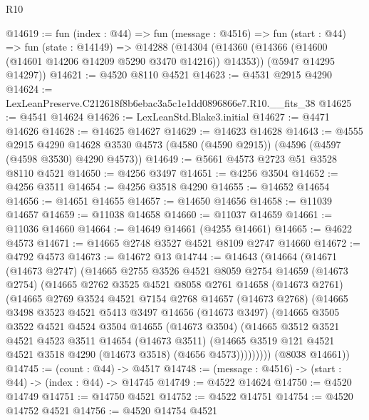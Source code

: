 \begin{lexlean}{R10}
\begin{coremodule}
@14619 := fun (index : @44) =>
  fun (message : @4516) =>
  fun (start : @44) =>
  fun (state : @14149) =>
  @14288
    (@14304
      (@14360 (@14366 (@14600 (@14601 @14206 @14209 @5290 @3470 @14216)) @14353))
      (@5947 @14295 @14297))
@14621 := @4520 @8110 @4521
@14623 := @4531 @2915 @4290
@14624 := LexLeanPreserve.C212618f8b6ebac3a5c1e1dd0896866e7.R10.__fits_38
@14625 := @4541 @14624
@14626 := LexLeanStd.Blake3.initial
@14627 := @4471 @14626
@14628 := @14625 @14627
@14629 := @14623 @14628
@14643 := @4555
    @2915
    @4290
    @14628
    @3530
    @4573
    (@4580 (@4590 @2915))
    (@4596 (@4597 (@4598 @3530) @4290 @4573))
@14649 := @5661 @4573 @2723 @51 @3528 @8110 @4521
@14650 := @4256 @3497
@14651 := @4256 @3504
@14652 := @4256 @3511
@14654 := @4256 @3518 @4290
@14655 := @14652 @14654
@14656 := @14651 @14655
@14657 := @14650 @14656
@14658 := @11039 @14657
@14659 := @11038 @14658
@14660 := @11037 @14659
@14661 := @11036 @14660
@14664 := @14649 @14661 (@4255 @14661)
@14665 := @4622 @4573
@14671 := @14665 @2748 @3527 @4521 @8109 @2747 @14660
@14672 := @4792 @4573
@14673 := @14672 @13
@14744 := @14643
    (@14664
      (@14671
        (@14673 @2747)
        (@14665
          @2755
          @3526
          @4521
          @8059
          @2754
          @14659
          (@14673 @2754)
          (@14665
            @2762
            @3525
            @4521
            @8058
            @2761
            @14658
            (@14673 @2761)
            (@14665
              @2769
              @3524
              @4521
              @7154
              @2768
              @14657
              (@14673 @2768)
              (@14665
                @3498
                @3523
                @4521
                @5413
                @3497
                @14656
                (@14673 @3497)
                (@14665
                  @3505
                  @3522
                  @4521
                  @4524
                  @3504
                  @14655
                  (@14673 @3504)
                  (@14665
                    @3512
                    @3521
                    @4521
                    @4523
                    @3511
                    @14654
                    (@14673 @3511)
                    (@14665 @3519 @121 @4521 @4521 @3518 @4290 (@14673 @3518) (@4656 @4573)))))))))
      (@8038 @14661))
@14745 := (count : @44) -> @4517
@14748 := (message : @4516) -> (start : @44) -> (index : @44) -> @14745
@14749 := @4522 @14624
@14750 := @4520 @14749
@14751 := @14750 @4521
@14752 := @4522 @14751
@14754 := @4520 @14752 @4521
@14756 := @4520 @14754 @4521

\end{coremodule}
\end{lexlean}
